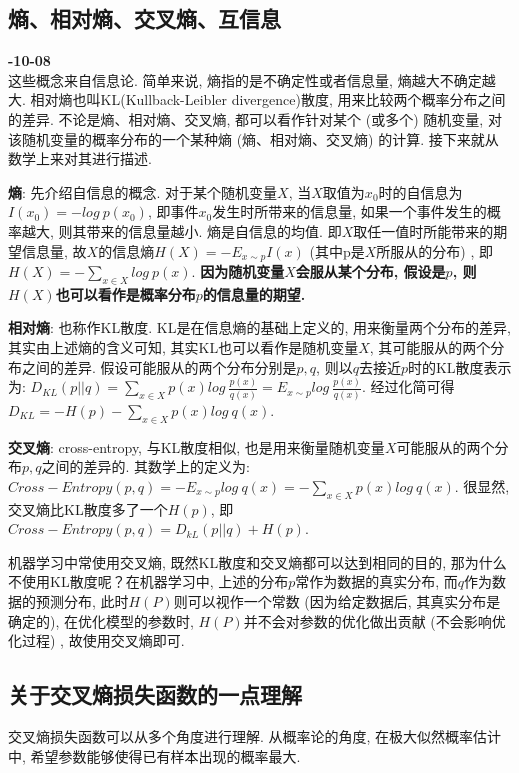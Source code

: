 \subsection{熵、相对熵、交叉熵、互信息} 
\textbf{-10-08}\\
这些概念来自信息论\cite{6773024}. 简单来说, 熵指的是不确定性或者信息量, 熵越大不确定越大. 相对熵也叫KL(Kullback-Leibler divergence)散度, 用来比较两个概率分布之间的差异. 不论是熵、相对熵、交叉熵, 都可以看作针对某个 (或多个) 随机变量, 对该随机变量的概率分布的一个某种熵 (熵、相对熵、交叉熵) 的计算. 接下来就从数学上来对其进行描述. 

\textbf{熵}: 先介绍自信息的概念. 对于某个随机变量$X$, 当$X$取值为$x_0$时的自信息为$I(x_0) = -log\ p(x_0)$, 即事件$x_0$发生时所带来的信息量, 如果一个事件发生的概率越大, 则其带来的信息量越小. 熵是自信息的均值. 即$X$取任一值时所能带来的期望信息量, 故$X$的信息熵$H(X) = -E_{x\sim p}I(x)$ (其中p是$X$所服从的分布) , 即$H(X) = -\sum_{x \in X}log\ p(x)$. \textbf{因为随机变量$X$会服从某个分布, 假设是$p$, 则$H(X)$也可以看作是概率分布$p$的信息量的期望. }

\textbf{相对熵}: 也称作KL散度. KL是在信息熵的基础上定义的, 用来衡量两个分布的差异, 其实由上述熵的含义可知, 其实KL也可以看作是随机变量$X$, 其可能服从的两个分布之间的差异. 假设可能服从的两个分布分别是$p, q$, 则以$q$去接近$p$时的KL散度表示为: $D_{KL}(p||q) = \sum_{x \in X} p(x) log\ \frac{p(x)}{q(x)} = E_{x\sim p} log\ \frac{p(x)}{q(x)}$. 经过化简可得$D_{KL} = -H(p) - \sum_{x \in X}p(x)log\ q(x)$. 

\textbf{交叉熵}: \label{ce}cross-entropy, 与KL散度相似, 也是用来衡量随机变量$X$可能服从的两个分布$p, q$之间的差异的. 其数学上的定义为: $Cross-Entropy(p, q) = -E_{x\sim p} log\ q(x) = - \sum_{x \in X}p(x)log\ q(x)$. 很显然, 交叉熵比KL散度多了一个$H(p)$, 即$Cross-Entropy(p, q) = D_{kL}(p || q) + H(p)$. 

机器学习中常使用交叉熵, 既然KL散度和交叉熵都可以达到相同的目的, 那为什么不使用KL散度呢？在机器学习中, 上述的分布$p$常作为数据的真实分布, 而$q$作为数据的预测分布, 此时$H(P)$则可以视作一个常数 (因为给定数据后, 其真实分布是确定的), 在优化模型的参数时, $H(P)$并不会对参数的优化做出贡献 (不会影响优化过程) , 故使用交叉熵即可. 

\subsection{关于交叉熵损失函数的一点理解}
交叉熵损失函数可以从多个角度进行理解. 从概率论的角度, 在极大似然概率估计中, 希望参数能够使得已有样本出现的概率最大. 

